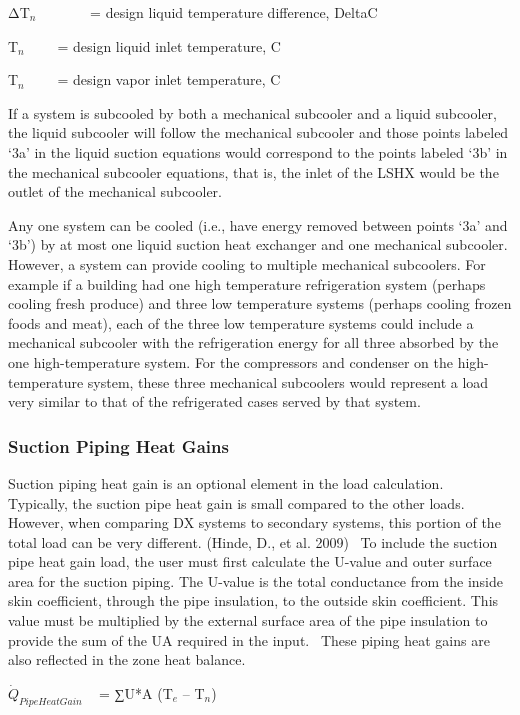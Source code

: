 ΔT\(_{n}\)~~~~~~~ = design liquid temperature difference, DeltaC

T\(_{n}\)~~~~ = design liquid inlet temperature, C

T\(_{n}\)~~~~ = design vapor inlet temperature, C

If a system is subcooled by both a mechanical subcooler and a liquid subcooler, the liquid subcooler will follow the mechanical subcooler and those points labeled `3a' in the liquid suction equations would correspond to the points labeled `3b' in the mechanical subcooler equations, that is, the inlet of the LSHX would be the outlet of the mechanical subcooler.

Any one system can be cooled (i.e., have energy removed between points `3a' and `3b') by at most one liquid suction heat exchanger and one mechanical subcooler. However, a system can provide cooling to multiple mechanical subcoolers. For example if a building had one high temperature refrigeration system (perhaps cooling fresh produce) and three low temperature systems (perhaps cooling frozen foods and meat), each of the three low temperature systems could include a mechanical subcooler with the refrigeration energy for all three absorbed by the one high-temperature system. For the compressors and condenser on the high-temperature system, these three mechanical subcoolers would represent a load very similar to that of the refrigerated cases served by that system.

\subsubsection{Suction Piping Heat Gains}\label{suction-piping-heat-gains}

Suction piping heat gain is an optional element in the load calculation.~ Typically, the suction pipe heat gain is small compared to the other loads.~ However, when comparing DX systems to secondary systems, this portion of the total load can be very different. (Hinde, D., et al. 2009) ~To include the suction pipe heat gain load, the user must first calculate the U-value and outer surface area for the suction piping. The U-value is the total conductance from the inside skin coefficient, through the pipe insulation, to the outside skin coefficient. This value must be multiplied by the external surface area of the pipe insulation to provide the sum of the UA required in the input.~ These piping heat gains are also reflected in the zone heat balance.

\({\dot Q_{PipeHeatGain}}\) ~ = ∑U*A (T\(_{e}\) -- T\(_{n}\))

